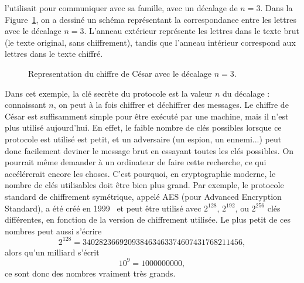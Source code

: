 l'utilisait pour communiquer avec sa famille, avec un décalage de $n=3$. Dans la
Figure~\ref{fig:caesar}, on a dessiné un schéma représentant la correspondance
entre les lettres avec le décalage $n=3$. L'anneau extérieur représente les
lettres dans le texte brut (le texte original, sans chiffrement), tandis que
l'anneau intérieur correspond aux lettres dans le texte chiffré.
\begin{figure}[h]
  \centering
  \caption{Representation du chiffre de César avec le décalage $n=3$.}
  \label{fig:caesar}
\end{figure}
Dans cet exemple, la clé secrète du protocole est la valeur $n$ du décalage :
connaissant $n$, on peut à la fois chiffrer et déchiffrer des messages. Le
chiffre de César est suffisamment simple pour être exécuté par une machine, mais
il n'est plus utilisé aujourd'hui. En effet, le faible nombre de clés possibles
lorsque ce protocole est utilisé est petit, et un adversaire (un espion, un
ennemi...) peut donc facilement deviner le message brut en essayant toutes les
clés possibles. On pourrait même demander à un ordinateur de faire cette
recherche, ce qui accélérerait encore les choses. C'est pourquoi, en
cryptographie moderne, le nombre de clés utilisables doit être bien plus grand.
Par exemple, le protocole standard de chiffrement symétrique, appelé AES (pour
Advanced Encryption Standard), a été créé en 1999~\cite{DR99, DR02} et peut être
utilisé avec $2^{128}$, $2^{192}$, ou $2^{256}$ clés différentes, en fonction de
la version de chiffrement utilisée. Le plus petit de ces nombres peut aussi
s'écrire
\[
  2^{128} = 340282366920938463463374607431768211456,
\]
alors qu'un milliard s'écrit
\[
  10^{9} = 1000000000,
\]
ce sont donc des nombres vraiment très grands.

